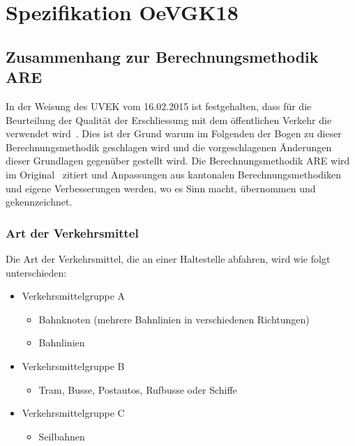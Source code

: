 \cleardoublepage
\section{Spezifikation OeVGK18}
\label{Spezifikation OeVGK18}

\subsection{Zusammenhang zur Berechnungsmethodik ARE}
\label{Spezifikation OeVGK18:Zusammenhang zur Berechnungsmethodik ARE}

In der Weisung des \acs{UVEK} vom 16.02.2015 ist festgehalten, dass für die Beurteilung der Qualität der Erschliessung mit dem öffentlichen Verkehr die  verwendet wird~\cite{weisung_uvek}.
Dies ist der Grund warum im Folgenden der Bogen zu dieser Berechnungsmethodik geschlagen wird und die vorgeschlagenen Änderungen dieser Grundlagen gegenüber gestellt wird.
Die Berechnungsmethodik \acs{ARE} wird im Original~\cite{berechnung_are} zitiert und Anpassungen aus kantonalen Berechnungsmethodiken und eigene Verbesserungen werden, wo es Sinn macht, übernommen und gekennzeichnet.

\subsubsection{Art der Verkehrsmittel}
\label{Zusammenhang zur Berechnungsmethodik ARE:Art der Verkehrsmittel}

\begin{itquote}
Die Art der Verkehrsmittel, die an einer Haltestelle abfahren, wird wie folgt unterschieden:
\begin{itemize}[noitemsep]
    \item Verkehrsmittelgruppe A
    \begin{itemize}
        \item Bahnknoten (mehrere Bahnlinien in verschiedenen Richtungen)
        \item Bahnlinien
    \end{itemize}
    \item Verkehrsmittelgruppe B
    \begin{itemize}
        \item Tram, Busse, Postautos, Rufbusse oder Schiffe
    \end{itemize}
    \item Verkehrsmittelgruppe C
    \begin{itemize}
        \item Seilbahnen
    \end{itemize}
\end{itemize}
\end{itquote}

